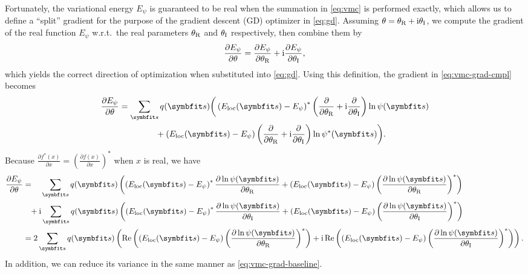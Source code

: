 Fortunately, the variational energy $E_\psi$ is guaranteed to be real when the summation in \cref{eq:vmc} is performed exactly, which allows us to define a ``split'' gradient for the purpose of the gradient descent (GD) optimizer in \cref{eq:gd}. Assuming $\theta = {\theta_\text{R}} + \mathrm{i} {\theta_\text{I}}$,  we compute the gradient of the real function $E_\psi$ w.r.t.\ the real parameters ${\theta_\text{R}}$ and ${\theta_\text{I}}$ respectively, then combine them by
\begin{equation}
\frac{\partial E_\psi}{\partial \theta} = \frac{\partial E_\psi}{\partial {\theta_\text{R}}} + \mathrm{i} \frac{\partial E_\psi}{\partial {\theta_\text{I}}},
\end{equation}
which yields the correct direction of optimization when substituted into \cref{eq:gd}. Using this definition, the gradient in \cref{eq:vmc-grad-cmpl} becomes
\begin{align}
\frac{\partial E_\psi}{\partial \theta}
&= \sum_\vs q(\vs) \bigg(
\left( E_\text{loc}(\vs) - E_\psi \right)^* \ptri \ln \psi(\vs) \nonumber \\
&\phantom{{}={}} \qquad\quad + \left( E_\text{loc}(\vs) - E_\psi \right) \ptri \ln \psi^*(\vs)
\bigg).
\end{align}
Because $\frac{\partial f^*(x)}{\partial x} = \left( \frac{\partial f(x)}{\partial x} \right)^*$ when $x$ is real, we have
\begin{align}
\frac{\partial E_\psi}{\partial \theta}
&= \phantom{+ \rmi}\!\sum_\vs q(\vs) \left(
\left( E_\text{loc}(\vs) - E_\psi \right)^* \frac{\partial \ln \psi(\vs)}{\partial \thetar}
+ \left( E_\text{loc}(\vs) - E_\psi \right) \left( \frac{\partial \ln \psi(\vs)}{\partial \thetar} \right)^*
\right) \nonumber \\
&\phantom{=} + \rmi \sum_\vs q(\vs) \left(
\left( E_\text{loc}(\vs) - E_\psi \right)^* \frac{\partial \ln \psi(\vs)}{\partial \thetai}
+ \left( E_\text{loc}(\vs) - E_\psi \right) \left( \frac{\partial \ln \psi(\vs)}{\partial \thetai} \right)^*
\right) \\
&= 2 \sum_\vs q(\vs) \left(
\Re\left( \left( E_\text{loc}(\vs) - E_\psi \right) \left( \frac{\partial \ln \psi(\vs)}{\partial \thetar} \right)^* \right)
+ \rmi \Re\left( \left( E_\text{loc}(\vs) - E_\psi \right) \left( \frac{\partial \ln \psi(\vs)}{\partial \thetai} \right)^* \right)
\right). \label{eq:vmc-grad-split}
\end{align}
In addition, we can reduce its variance in the same manner as \cref{eq:vmc-grad-baseline}.

